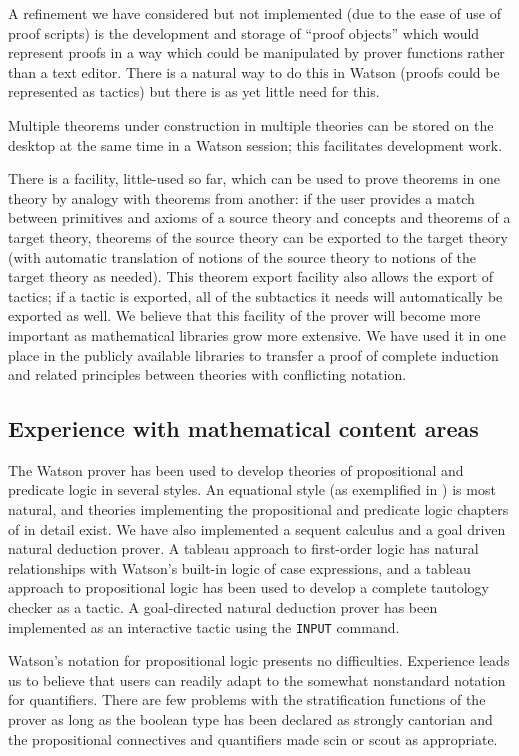 \documentclass{kluwer}
\begin{document}
\begin{article}
A refinement we have considered but not implemented (due to the ease
of use of proof scripts) is the development and storage of ``proof
objects'' which would represent proofs in a way which could be
manipulated by prover functions rather than a text editor.  There is a
natural way to do this in Watson (proofs could be represented as
tactics) but there is as yet little need for this.

Multiple theorems under construction in multiple theories can be
stored on the desktop at the same time in a Watson session; this
facilitates development work.

There is a facility, little-used so far, which can be used to prove
theorems in one theory by analogy with theorems from another: if the
user provides a match between primitives and axioms of a source theory
and concepts and theorems of a target theory, theorems of the source
theory can be exported to the target theory (with automatic
translation of notions of the source theory to notions of the target
theory as needed).  This theorem export facility also allows the
export of tactics; if a tactic is exported, all of the subtactics it
needs will automatically be exported as well.  We believe that this
facility of the prover will become more important as mathematical
libraries grow more extensive.  We have used it in one place in the
publicly available libraries to transfer a proof of complete
induction and related principles between theories with conflicting
notation.

\subsection {Experience with mathematical content areas}

The Watson prover has been used to develop theories of propositional
and predicate logic in several styles.  An equational style (as
exemplified in \cite{gries}) is most natural, and theories
implementing the propositional and predicate logic chapters of
\cite{gries} in detail exist. We have also implemented a sequent
calculus and a goal driven natural deduction prover.  A tableau
approach to first-order logic has natural relationships with Watson's
built-in logic of case expressions, and a tableau approach to
propositional logic has been used to develop a complete tautology
checker as a tactic.  A goal-directed natural deduction prover has
been implemented as an interactive tactic using the {\tt INPUT\/}
command.

Watson's notation for propositional logic presents no difficulties.
Experience leads us to believe that users can readily adapt to the
somewhat nonstandard notation for quantifiers.  There are few problems
with the stratification functions of the prover as long as the boolean
type has been declared as strongly cantorian and the propositional
connectives and quantifiers made scin or scout as appropriate.


\end{article}
\end{document}
